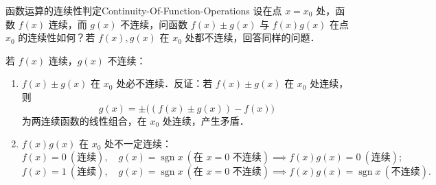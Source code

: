 \begin{problem}{函数运算的连续性判定}{Continuity-Of-Function-Operations}
    设在点 $x = x_0$ 处，函数 $f(x)$ 连续，而 $g(x)$ 不连续，问函数 $f(x)\pm g(x)$ 与 $f(x)g(x)$ 在点 $x_0$ 的连续性如何？若 $f(x), g(x)$ 在 $x_0$ 处都不连续，回答同样的问题．
\end{problem}

\begin{solution}
    若 $f(x)$ 连续，$g(x)$ 不连续：
    \begin{enumerate}
        \item $f(x) \pm g(x)$ 在 $x_0$ 处必不连续．反证：若 $f(x) \pm g(x)$ 在 $x_0$ 处连续，则
              \begin{equation}
                  g(x) = \pm\bigl( (f(x) \pm g(x)) - f(x) \bigr)
              \end{equation}
              为两连续函数的线性组合，在 $x_0$ 处连续，产生矛盾．
        \item $f(x)g(x)$ 在 $x_0$ 处不一定连续：
              \begin{equation}
                  f(x) = 0 \ (\text{连续}), \quad g(x) = \operatorname{sgn} x \ (\text{在 } x = 0 \text{ 不连续}) \implies f(x)g(x) = 0 \ (\text{连续});
              \end{equation}
              \begin{equation}
                  f(x) = 1 \ (\text{连续}), \quad g(x) = \operatorname{sgn} x \ (\text{在 } x = 0 \text{ 不连续}) \implies f(x)g(x) = \operatorname{sgn} x \ (\text{不连续}).
              \end{equation}
    \end{enumerate}


\end{solution}
